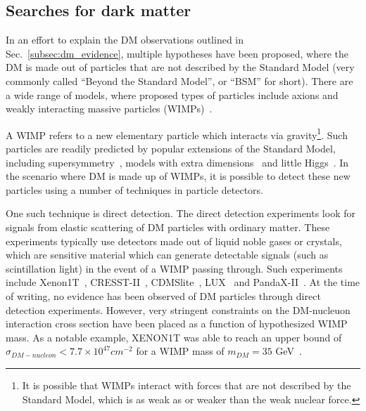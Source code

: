 \subsection{Searches for dark matter}

In an effort to explain the DM observations outlined in Sec.~\ref{subsec:dm_evidence},
multiple hypotheses have been proposed, where the DM is made out of particles that are not
described by the Standard Model (very commonly called ``Beyond the Standard Model'', or ``BSM'' for short).
There are a wide range of models, where proposed types of particles include axions and weakly interacting 
massive particles (WIMPs)~\cite{Profumo:2017hqp}.


A WIMP refers to a new elementary particle which interacts via gravity\footnote{It is possible that WIMPs interact
with forces that are not described by the Standard Model, which is as weak as or weaker than the weak nuclear force.}.
Such particles are readily predicted by popular extensions of the Standard Model, including 
supersymmetry~\cite{Jungman:1995df}, models with extra dimensions~\cite{Dienes:1998vh}  
and little Higgs~\cite{Arkani-Hamed:2002ikv}. In the scenario where DM is made up of WIMPs, it is possible to
detect these new particles using a number of techniques in particle detectors. 

One such technique is direct detection. The direct detection experiments look for signals from elastic scattering of DM
particles with ordinary matter. These experiments typically use detectors made out of liquid noble gases or crystals,
which are sensitive material which can generate detectable signals (such as scintillation light) in the event of a WIMP
passing through.
Such experiments include Xenon1T~\cite{XENON:2017vdw}, CRESST-II~\cite{Angloher:2011uu},
CDMSlite~\cite{SuperCDMS:2017nns}, LUX~\cite{LUX:2015abn} and PandaX-II~\cite{PandaX-II:2016vec}. At the time of writing,
no evidence has been observed of DM particles through direct detection experiments. However, very stringent constraints
on the DM-nucleuon interaction cross section have been placed as a function of hypothesized WIMP mass. 
As a notable example, XENON1T was able
to reach an upper bound of $\sigma_{DM-nucleon} < 7.7 \times 10^{47} cm^{-2}$ for a WIMP mass of $m_{DM} = 35$
GeV~\cite{XENON:2017vdw}.

